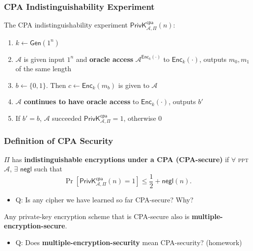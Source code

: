 \begin{frame}\frametitle{CPA Indistinguishability Experiment}
The CPA indistinguishability experiment $\mathsf{PrivK}^{\mathsf{cpa}}_{\mathcal{A},\Pi}(n)$:
\begin{enumerate}
	\item $k \gets \mathsf{Gen}(1^n)$
	\item $\mathcal{A}$ is given input $1^n$ and \textbf{oracle access} $\mathcal{A}^{\mathsf{Enc}_k(\cdot)}$ to $\mathsf{Enc}_k(\cdot)$, outputs $m_0, m_1$ of the same length
	\item $b \gets \{0,1\}$. Then $c \gets \mathsf{Enc}_k(m_b)$ is given to $\mathcal{A}$
	\item $\mathcal{A}$ \textbf{continues to have oracle access} to $\mathsf{Enc}_k(\cdot)$, outputs $b'$
	\item If $b' = b$, $\mathcal{A}$ succeeded $\mathsf{PrivK}^{\mathsf{cpa}}_{\mathcal{A},\Pi}=1$, otherwise 0
\end{enumerate}
\begin{figure}
\begin{center}

\end{center}
\end{figure}
\end{frame}
\begin{frame}\frametitle{Definition of CPA Security}
\begin{definition}\label{def:cap-ind}
$\Pi$ has \textbf{indistinguishable encryptions under a CPA (CPA-secure)} if $\forall$ \textsc{ppt} $\mathcal{A}$, $\exists$ $\mathsf{negl}$ such that
\[ \Pr\left[\mathsf{PrivK}^{\mathsf{cpa}}_{\mathcal{A},\Pi}(n)=1\right] \le \frac{1}{2} + \mathsf{negl}(n).
\]
\end{definition}
\begin{itemize}
\item \alert{Q: Is any cipher we have learned so far CPA-secure? Why?}
\end{itemize}
\begin{proposition}
Any private-key encryption scheme that is CPA-secure also is \textbf{multiple-encryption-secure}.
\end{proposition}
\begin{itemize}
\item \alert{Q: Does \textbf{multiple-encryption-security} mean CPA-security?} (homework)
\end{itemize}
\end{frame}
